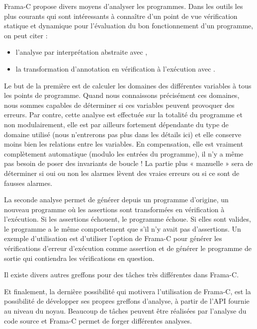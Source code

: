 

Frama-C propose divers moyens d'analyser les programmes. Dans les outils les
plus courants qui sont intéressants à connaître d'un point de vue vérification
statique et dynamique pour l'évaluation du bon fonctionnement d'un programme,
on peut citer :
\begin{itemize}
\item l'analyse par interprétation abstraite avec
,
\item la transformation d'annotation en vérification à l'exécution avec
.
\end{itemize}


Le but de la première est de calculer les domaines des différentes variables à
tous les points de programme. Quand nous connaissons précisément ces domaines,
nous sommes capables de déterminer si ces variables peuvent provoquer des erreurs.
Par contre, cette analyse est effectuée sur la totalité du programme et non
modulairement, elle est par ailleurs fortement dépendante du type de domaine
utilisé (nous n'entrerons pas plus dans les détails ici) et elle conserve moins
bien les relations entre les variables. En compensation, elle est vraiment
complètement automatique (modulo les entrées du programme), il n'y a même pas
besoin de poser des invariants de boucle ! La partie plus « manuelle » sera de
déterminer si oui ou non les alarmes lèvent des vraies erreurs ou si ce sont de
fausses alarmes.



La seconde analyse permet de générer depuis un programme d'origine, un nouveau
programme où les assertions sont transformées en vérification à l'exécution. Si
les assertions échouent, le programme échoue. Si elles sont valides, le programme
a le même comportement que s'il n'y avait pas d'assertions. Un exemple
d'utilisation est d'utiliser l'option  de Frama-C pour générer les
vérifications d'erreur d'exécution comme assertion et de générer le programme de
sortie qui contiendra les vérifications en question.



Il existe divers autres greffons pour des tâches très différentes dans Frama-C.


Et finalement, la dernière possibilité qui motivera l'utilisation de Frama-C,
est la possibilité de développer ses propres greffons d'analyse, à partir de
l'API fournie au niveau du noyau. Beaucoup de tâches peuvent être réalisées par
l'analyse du code source et Frama-C permet de forger différentes analyses.


